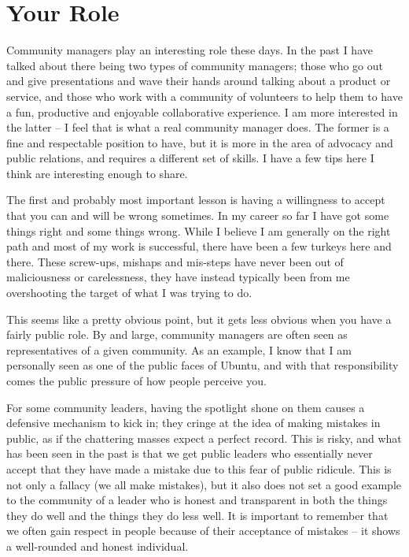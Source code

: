 \section*{Your Role}

Community managers play an interesting role these days. In the past I have
talked about there being two types of community managers; those who go out and
give presentations and wave their hands around talking about a product or
service, and those who work with a community of volunteers to help them to have
a fun, productive and enjoyable collaborative experience. I am more interested
in the latter -- I feel that is what a real community manager does. The former
is a fine and respectable position to have, but it is more in the area of
advocacy and public relations, and requires a different set of skills. I have a
few tips here I think are interesting enough to share.

The first and probably most important lesson is having a willingness to accept
that you can and will be wrong sometimes. In my career so far I have got some
things right and some things wrong. While I believe I am generally on the right
path and most of my work is successful, there have been a few turkeys here and
there. These screw-ups, mishaps and mis-steps have never been out of
maliciousness or carelessness, they have instead typically been from me
overshooting the target of what I was trying to do.

This seems like a pretty obvious point, but it gets less obvious when you have a
fairly public role. By and large, community managers are often seen as
representatives of a given community. As an example, I know that I am personally
seen as one of the public faces of Ubuntu, and with that responsibility comes
the public pressure of how people perceive you.

For some community leaders, having the spotlight shone on them causes a
defensive mechanism to kick in; they cringe at the idea of making mistakes in
public, as if the chattering masses expect a perfect record. This is risky, and
what has been seen in the past is that we get public leaders who essentially
never accept that they have made a mistake due to this fear of public ridicule.
This is not only a fallacy (we all make mistakes), but it also does not set a
good example to the community of a leader who is honest and transparent in both
the things they do well and the things they do less well. It is important to
remember that we often gain respect in people because of their acceptance of
mistakes -- it shows a well-rounded and honest individual.

